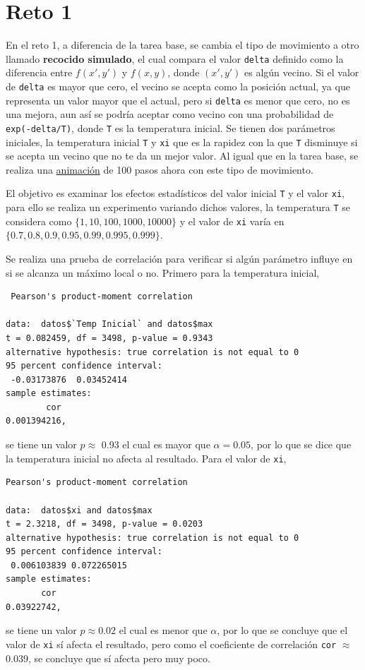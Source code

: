 \documentclass[12pt,letterpaper]{article}
\begin{document}
 \section{Reto 1}
 En el reto 1, a diferencia de la tarea base, se cambia el tipo de movimiento a otro llamado \textbf{recocido simulado}, el cual compara el valor \texttt{delta} definido como la diferencia entre $f(x',y')$ y $f(x,y)$, donde $(x',y')$ es algún vecino. Si el valor de \texttt{delta} es mayor que cero, el vecino se acepta como la posición actual, ya que representa un valor mayor que el actual, pero si \texttt{delta} es menor que cero, no es una mejora, aun así se podría aceptar como vecino con una probabilidad de \texttt{exp(-delta/T)}, donde \texttt{T} es la temperatura inicial. Se tienen dos parámetros iniciales, la temperatura inicial \texttt{T} y \texttt{xi} que es la rapidez con la que \texttt{T} disminuye si se acepta un vecino que no te da un mejor valor. Al igual que en la tarea base, se realiza una \href{https://github.com/fvzqa/Simulacion/blob/master/Tarea7/Animaciones/reto1.gif}{animación} de 100 pasos ahora con este tipo de movimiento.  
 
 El objetivo es examinar los efectos estadísticos del valor inicial \texttt{T} y el valor \texttt{xi}, para ello se realiza un experimento variando dichos valores, la temperatura \texttt{T} se considera como $\{1, 10, 100, 1000, 10000\}$ y el valor de \texttt{xi} varía en $\{0.7, 0.8, 0.9, 0.95, 0.99, 0.995, 0.999 \}$.
 
 Se realiza una prueba de correlación para verificar si algún parámetro influye en si se alcanza un máximo local o no. Primero para la temperatura inicial,
 \begin{verbatim}
 Pearson's product-moment correlation

data:  datos$`Temp Inicial` and datos$max
t = 0.082459, df = 3498, p-value = 0.9343
alternative hypothesis: true correlation is not equal to 0
95 percent confidence interval:
 -0.03173876  0.03452414
sample estimates:
        cor 
0.001394216, 
 \end{verbatim}
 se tiene un valor $p \approx$ 0.93 el cual es mayor que $\alpha=0.05$, por lo que se dice que la temperatura inicial no afecta al resultado. Para el valor de \texttt{xi},
\begin{verbatim}
Pearson's product-moment correlation

data:  datos$xi and datos$max
t = 2.3218, df = 3498, p-value = 0.0203
alternative hypothesis: true correlation is not equal to 0
95 percent confidence interval:
 0.006103839 0.072265015
sample estimates:
       cor 
0.03922742, 
\end{verbatim}
se tiene un valor $p \approx 0.02$ el cual es menor que $\alpha$, por lo que se concluye que el valor de \texttt{xi} sí afecta el resultado, pero como el coeficiente de correlación \texttt{cor} $\approx$ 0.039, se concluye que sí afecta pero muy poco.  
\end{document}
